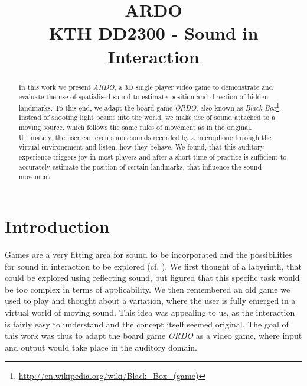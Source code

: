 \documentclass[conference]{IEEEtran}
\begin{document}
% 
\title{ARDO \\ {\LARGE KTH DD2300 - Sound in Interaction}}
\author{
    \and
}
\maketitle
% 
% 
\begin{abstract}
In this work we present \textit{ARDO}, a 3D single player video game to demonstrate and evaluate the use of spatialised sound to estimate position and direction of hidden landmarks. 
To this end, we adapt the board game \textit{ORDO}, also known as \textit{Black Box}\footnote{\url{http://en.wikipedia.org/wiki/Black_Box_(game)}}. 
Instead of shooting light beams into the world, we make use of sound attached to a moving source, which follows the same rules of movement as in the original. 
Ultimately, the user can even shoot sounds recorded by a microphone through the virtual environement and listen, how they behave. 
We found, that this auditory experience triggers joy in most players and after a short time of practice is sufficient to accurately estimate the position of certain landmarks, that influence the sound movement.
\end{abstract}
% 
% 
\section{Introduction}
Games are a very fitting area for sound to be incorporated and the possibilities for sound in interaction to be explored (cf. \cite{Hermann06}). 
We first thought of a labyrinth, that could be explored using reflecting sound, but figured that this specific task would be too complex in terms of applicability. 
We then remembered an old game we used to play and thought about a variation, where the user is fully emerged in a virtual world of moving sound. 
This idea was appealing to us, as the interaction is fairly easy to understand and the concept itself seemed original. 
The goal of this work was thus to adapt the board game \textit{ORDO} as a video game, where input and output would take place in the auditory domain.
% 
% 
\end{document}

